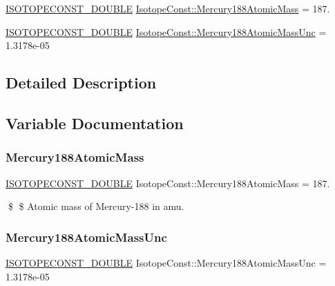 \begin{DoxyCompactItemize}
\item 
\mbox{\hyperlink{group___isotope_const-_macros_ga8f45a7272ce02c0b4c65c44636ed719a}{I\+S\+O\+T\+O\+P\+E\+C\+O\+N\+S\+T\+\_\+\+D\+O\+U\+B\+LE}} \mbox{\hyperlink{group___isotope_const-_mercury-_hg188_ga6abea2ac9bd5b23b59c5cc3708b774f5}{Isotope\+Const\+::\+Mercury188\+Atomic\+Mass}} = 187.
\item 
\mbox{\hyperlink{group___isotope_const-_macros_ga8f45a7272ce02c0b4c65c44636ed719a}{I\+S\+O\+T\+O\+P\+E\+C\+O\+N\+S\+T\+\_\+\+D\+O\+U\+B\+LE}} \mbox{\hyperlink{group___isotope_const-_mercury-_hg188_ga4c42bf46bc231082090f4f1944c6887c}{Isotope\+Const\+::\+Mercury188\+Atomic\+Mass\+Unc}} = 1.\+3178e-\/05
\end{DoxyCompactItemize}


\subsection{Detailed Description}


\subsection{Variable Documentation}
\mbox{\label{group___isotope_const-_mercury-_hg188_ga6abea2ac9bd5b23b59c5cc3708b774f5}} 
\subsubsection{\texorpdfstring{Mercury188\+Atomic\+Mass}{Mercury188AtomicMass}}
{\footnotesize\ttfamily \mbox{\hyperlink{group___isotope_const-_macros_ga8f45a7272ce02c0b4c65c44636ed719a}{I\+S\+O\+T\+O\+P\+E\+C\+O\+N\+S\+T\+\_\+\+D\+O\+U\+B\+LE}} Isotope\+Const\+::\+Mercury188\+Atomic\+Mass = 187.}

\$ \$ Atomic mass of Mercury-\/188 in amu. \mbox{\label{group___isotope_const-_mercury-_hg188_ga4c42bf46bc231082090f4f1944c6887c}} 
\subsubsection{\texorpdfstring{Mercury188\+Atomic\+Mass\+Unc}{Mercury188AtomicMassUnc}}
{\footnotesize\ttfamily \mbox{\hyperlink{group___isotope_const-_macros_ga8f45a7272ce02c0b4c65c44636ed719a}{I\+S\+O\+T\+O\+P\+E\+C\+O\+N\+S\+T\+\_\+\+D\+O\+U\+B\+LE}} Isotope\+Const\+::\+Mercury188\+Atomic\+Mass\+Unc = 1.\+3178e-\/05}

